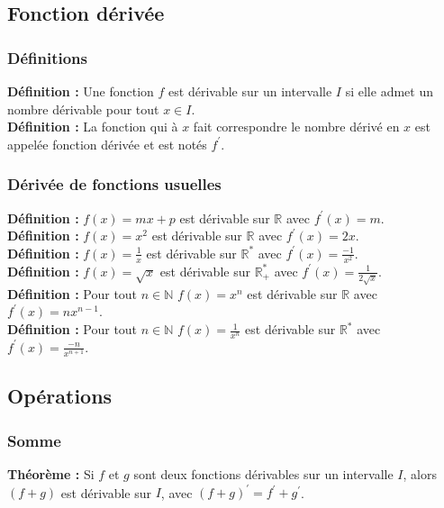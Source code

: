 \documentclass[a4paper,titlepage]{article}
\begin{document}
    \subsection{Fonction dérivée}
        \subsubsection{Définitions}
            \textbf{Définition :} Une fonction $f$ est dérivable sur un intervalle $I$ si elle admet un nombre dérivable pour tout $x\in I$.
            \\
            \textbf{Définition :} La fonction qui à $x$ fait correspondre le nombre dérivé en $x$ est appelée fonction dérivée et est notés $f^{\prime}$.
        \subsubsection{Dérivée de fonctions usuelles}
            \textbf{Définition :} $f\left(x\right)=mx+p$ est dérivable sur $\mathbb{R}$ avec $f^{\prime}\left(x\right)=m$.
            \\
            \textbf{Définition :} $f\left(x\right)=x^{2}$ est dérivable sur $\mathbb{R}$ avec $f^{\prime}\left(x\right)=2x$.
            \\
            \textbf{Définition :} $f\left(x\right)=\frac{1}{x}$ est dérivable sur $\mathbb{R}^{*}$ avec $f^{\prime}\left(x\right)=\frac{-1}{x^{2}}$.
            \\
            \textbf{Définition :} $f\left(x\right)=\sqrt{x}$ est dérivable sur $\mathbb{R}_{+}^{*}$ avec $f^{\prime}\left(x\right)=\frac{1}{2\sqrt{x}}$.
            \\
            \textbf{Définition :} Pour tout $n\in\mathbb{N}$ $f\left(x\right)=x^{n}$ est dérivable sur $\mathbb{R}$ avec $f^{\prime}\left(x\right)=nx^{n-1}$.
            \\
            \textbf{Définition :} Pour tout $n\in\mathbb{N}$ $f\left(x\right)=\frac{1}{x^{n}}$ est dérivable sur $\mathbb{R}^{*}$ avec $f^{\prime}\left(x\right)=\frac{-n}{x^{n+1}}$.
    \subsection{Opérations}
        \subsubsection{Somme}
            \textbf{Théorème :} Si $f$ et $g$ sont deux fonctions dérivables sur un intervalle $I$, alors $\left(f+g\right)$ est dérivable sur $I$, avec $\left(f+g\right)^{\prime}=f^{\prime}+g^{\prime}$.
\end{document}
